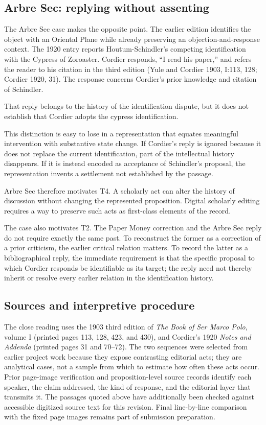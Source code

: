 \documentclass[11pt,a4paper]{article}
\begin{document}
\subsection{Arbre Sec: replying without assenting}

The Arbre Sec case makes the opposite point. The earlier edition identifies the object with an Oriental Plane while already preserving an objection-and-response context. The 1920 entry reports Houtum-Schindler's competing identification with the Cypress of Zoroaster. Cordier responds, “I read his paper,” and refers the reader to his citation in the third edition (Yule and Cordier 1903, I:113, 128; Cordier 1920, 31). The response concerns Cordier's prior knowledge and citation of Schindler.


That reply belongs to the history of the identification dispute, but it does not establish that Cordier adopts the cypress identification.


This distinction is easy to lose in a representation that equates meaningful intervention with substantive state change. If Cordier's reply is ignored because it does not replace the current identification, part of the intellectual history disappears. If it is instead encoded as acceptance of Schindler's proposal, the representation invents a settlement not established by the passage.


Arbre Sec therefore motivates T4. A scholarly act can alter the history of discussion without changing the represented proposition. Digital scholarly editing requires a way to preserve such acts as first-class elements of the record.


The case also motivates T2. The Paper Money correction and the Arbre Sec reply do not require exactly the same past. To reconstruct the former as a correction of a prior criticism, the earlier critical relation matters. To record the latter as a bibliographical reply, the immediate requirement is that the specific proposal to which Cordier responds be identifiable as its target; the reply need not thereby inherit or resolve every earlier relation in the identification history.


\subsection{Sources and interpretive procedure}

The close reading uses the 1903 third edition of \emph{The Book of Ser Marco Polo}, volume I (printed pages 113, 128, 423, and 430), and Cordier's 1920 \emph{Notes and Addenda} (printed pages 31 and 70–72). The two sequences were selected from earlier project work because they expose contrasting editorial acts; they are analytical cases, not a sample from which to estimate how often these acts occur. Prior page-image verification and proposition-level source records identify each speaker, the claim addressed, the kind of response, and the editorial layer that transmits it. The passages quoted above have additionally been checked against accessible digitized source text for this revision. Final line-by-line comparison with the fixed page images remains part of submission preparation.
\end{document}
